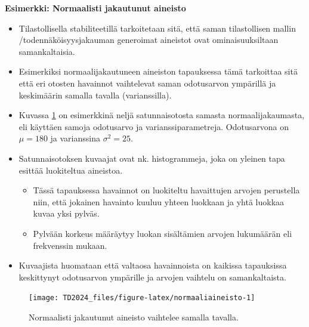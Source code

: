 \documentclass[
]{book}
\providecommand{\tightlist}{%
  \setlength{\itemsep}{0pt}\setlength{\parskip}{0pt}}
\begin{document}
\begin{eblock}{}

\textbf{Esimerkki: Normaalisti jakautunut aineisto}

\begin{itemize}
\tightlist
\item
  Tilastollisella stabiliteetillä tarkoitetaan sitä, että saman tilastollisen mallin /todennäköisyysjakauman generoimat aineistot ovat ominaisuuksiltaan samankaltaisia.\\
\item
  Esimerkiksi normaalijakautuneen aineiston tapauksessa tämä tarkoittaa sitä että eri otosten havainnot vaihtelevat saman odotusarvon ympärillä ja keskimäärin samalla tavalla (varianssilla).\\
\item
  Kuvassa \ref{fig:normaaliaineisto} on esimerkkinä neljä satunnaisotosta samasta normaalijakaumasta, eli käyttäen samoja odotusarvo ja varianssiparametreja. Odotusarvona on \(\mu = 180\) ja varianssina \(\sigma^2 = 25\).
\end{itemize}

\hfill\break

\begin{itemize}
\tightlist
\item
  Satunnaisotoksen kuvaajat ovat nk. histogrammeja, joka on yleinen tapa esittää luokiteltua aineistoa.

  \begin{itemize}
  \tightlist
  \item
    Tässä tapauksessa havainnot on luokiteltu havaittujen arvojen perustella niin, että jokainen havainto kuuluu yhteen luokkaan ja yhtä luokkaa kuvaa yksi pylväs.\\
  \item
    Pylvään korkeus määräytyy luokan sisältämien arvojen lukumäärän eli frekvenssin mukaan.
  \end{itemize}
\item
  Kuvaajista huomataan että valtaosa havainnoista on kaikissa tapauksissa keskittynyt odotusarvon ympärille ja arvojen vaihtelu on samankaltaista.
\end{itemize}

\end{eblock}

\begin{figure}

{\centering \texttt{[image: TD2024\_files/figure-latex/normaaliaineisto-1]} 

}

\caption{Normaalisti jakautunut aineisto vaihtelee samalla tavalla.}\label{fig:normaaliaineisto}
\end{figure}
\end{document}
